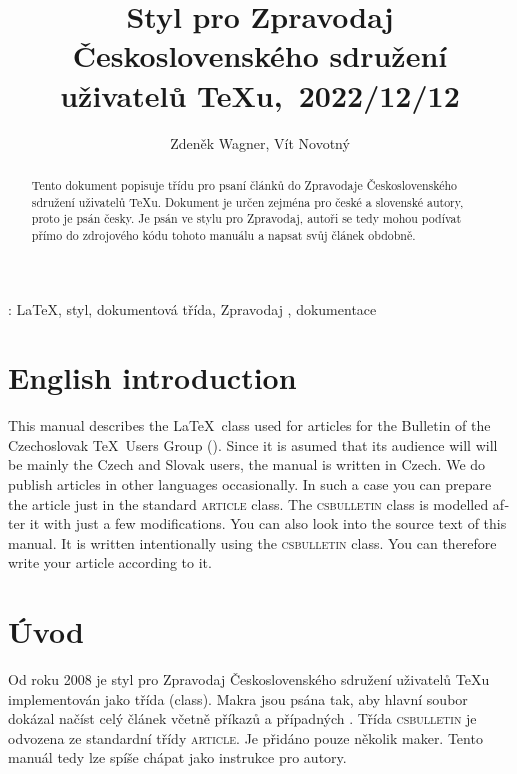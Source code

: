 \documentclass{csbulletin}
\DeclareRobustCommand\version{\unskip~2022/12/12}
\let\pkg\textsc
\begin{document}
\title{Styl pro Zpravodaj Československého sdružení uživatelů \TeX{}u,\version}
\EnglishTitle{\LaTeX\ Class for \CSTUG\ Bulletin,\version}
\author{Zdeněk Wagner, Vít Novotný}
\maketitle

\begin{abstract}
Tento dokument popisuje třídu pro psaní článků do Zpravodaje Československého sdružení uživatelů
\TeX{}u. Dokument je určen zejména pro české a slovenské autory, proto je psán česky. Je psán 
ve stylu pro Zpravodaj, autoři se tedy mohou podívat přímo do zdrojového kódu tohoto manuálu a
napsat svůj článek obdobně.
\end{abstract}
\klicovaslova: \LaTeX, styl, dokumentová třída, Zpravodaj \CSTUG, dokumentace

\section{English introduction}
\begin{otherlanguage}{english}
This manual describes the \LaTeX\ class used for articles for the Bulletin of the Czechoslovak
\TeX\ Users Group (\cstug). Since it is asumed that its audience will will be mainly the Czech and
Slovak users, the manual is written in Czech. We do publish articles in other languages
occasionally. In such a case you can prepare the article just in the standard \pkg{article} class.
The \pkg{csbulletin} class is modelled after it with just a few modifications. You can also look
into the source text of this manual. It is written intentionally using the \pkg{csbulletin} class.
You can therefore write your article according to it.
\end{otherlanguage}

\section{Úvod}
Od roku 2008 je styl pro Zpravodaj Československého sdružení uživatelů \TeX{}u implementován jako
třída (class). Makra jsou psána tak, aby hlavní soubor dokázal načíst celý článek včetně příkazů
 a případných . Třída \pkg{csbulletin} je odvozena ze standardní
třídy \pkg{article}. Je přidáno pouze několik maker. Tento manuál tedy lze spíše chápat jako
instrukce pro autory.
\end{document}
